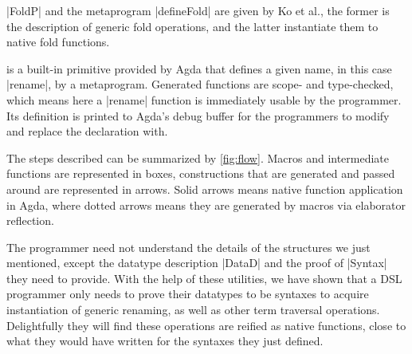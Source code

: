 \documentclass[sigplan,review,fleqn]{acmart}
\renewcommand{\verb}{\collectverb{\color{AgdaFunction}}}
\begin{document}
\begin{code}
	\>[2]%
	\>[309I]\AgdaSymbol{:}\AgdaSpace{}%
	\AgdaSymbol{(}\AgdaSpace{}%
	\AgdaSymbol{:}\AgdaSpace{}%
	\AgdaSymbol{)}\<%
	\\
	\>[.][@{}l@{}]\<[309I]%
	\>[7]\AgdaSpace{}%
	\AgdaSymbol{(}\AgdaSpace{}%
	\AgdaSymbol{:}\AgdaSpace{}%
	\AgdaSpace{}%
	\AgdaSymbol{)}\<%
	\\
	\>[7]\AgdaSpace{}%
	\AgdaSpace{}%
	\AgdaSpace{}%
	\AgdaSpace{}%
	\AgdaSpace{}%
	\<%
	\\
	\>[7]\AgdaSpace{}%
	\<%
	\\
	\\[\AgdaEmptyExtraSkip]%
	\>[0]\AgdaSpace{}%
	\AgdaSymbol{=}\AgdaSpace{}%
	\AgdaSpace{}%
	\AgdaSymbol{(}\AgdaSpace{}%
	\AgdaSymbol{)}\AgdaSpace{}%
	\AgdaSpace{}%
	\<%
\end{code}
\verb|FoldP| and the metaprogram \verb|defineFold| are given by Ko et al., the former is the description of generic fold operations, and the latter instantiate them to native fold functions.
\begin{code}
	\>[0]\AgdaSpace{}%
	\AgdaSpace{}%
	\AgdaSymbol{=}\AgdaSpace{}%
	\AgdaSpace{}%
	\AgdaSpace{}%
	\<%
\end{code}
 is a built-in primitive provided by Agda that defines a given name, in this case \verb|rename|, by a metaprogram.
Generated functions are scope- and type-checked, which means here a \verb|rename| function is immediately usable by the programmer.
Its definition is printed to Agda's debug buffer for the programmers to modify and replace the  declaration with.    

The steps described can be summarized by \cref{fig:flow}. 
Macros and intermediate functions are represented in boxes, constructions that are generated and passed around are represented in arrows.
Solid arrows means native function application in Agda, where dotted arrows means they are generated by macros via elaborator reflection.

The programmer need not understand the details of the structures we just mentioned, except the datatype description \verb|DataD| and the proof of \verb|Syntax| they need to provide.
With the help of these utilities, we have shown that a DSL programmer only needs to prove their datatypes to be syntaxes to acquire instantiation of generic renaming, as well as other term traversal operations.
Delightfully they will find these operations are reified as native functions, close to what they would have written for the syntaxes they just defined.
\end{document}
